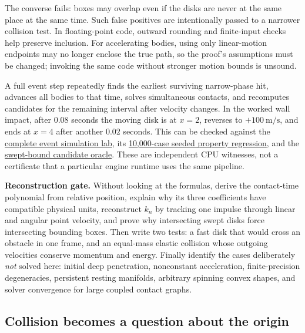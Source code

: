 The converse fails: boxes may overlap even if the disks are never at the same place at the same time. Such false positives are intentionally passed to a narrower collision test. In floating-point code, outward rounding and finite-input checks help preserve inclusion. For accelerating bodies, using only linear-motion endpoints may no longer enclose the true path, so the proof's assumptions must be changed; invoking the same code without stronger motion bounds is unsound.

A full event step repeatedly finds the earliest surviving narrow-phase hit, advances all bodies to that time, solves simultaneous contacts, and recomputes candidates for the remaining interval after velocity changes. In the worked wall impact, after \(0.08\) seconds the moving disk is at \(x=2\), reverses to \(+100\ \mathrm{m/s}\), and ends at \(x=4\) after another \(0.02\) seconds. This can be checked against the \hyperref[source-file-ad26f703e8f150d27a72bf93]{complete event simulation lab}, its \hyperref[source-file-50214a688c0ef812f3094877]{10,000-case seeded property regression}, and the \hyperref[source-file-6597829be009fc0bb1b17d87]{swept-bound candidate oracle}. These are independent CPU witnesses, not a certificate that a particular engine runtime uses the same pipeline.

\textbf{Reconstruction gate.} Without looking at the formulas, derive the contact-time polynomial from relative position, explain why its three coefficients have compatible physical units, reconstruct \(k_n\) by tracking one impulse through linear and angular point velocity, and prove why intersecting swept disks force intersecting bounding boxes. Then write two tests: a fast disk that would cross an obstacle in one frame, and an equal-mass elastic collision whose outgoing velocities conserve momentum and energy. Finally identify the cases deliberately \emph{not} solved here: initial deep penetration, nonconstant acceleration, finite-precision degeneracies, persistent resting manifolds, arbitrary spinning convex shapes, and solver convergence for large coupled contact graphs.

\subsection{Collision becomes a question about the origin}\label{01-foundations-i-ch018-collision-becomes-a-question-about-the-origin}

\hypertarget{01-foundations-i-ch018-collision-becomes-a-question-about-the-origin}{}

